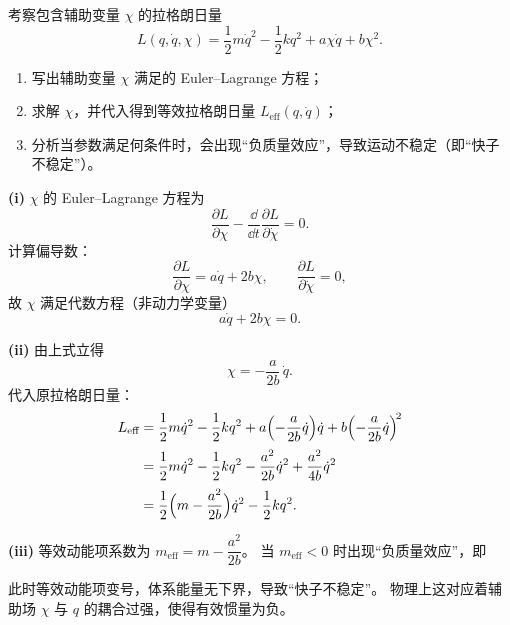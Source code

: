 \begin{question}[含辅助变量的拉格朗日量]
考察包含辅助变量 $\chi$ 的拉格朗日量
\[
L(q,\dot q,\chi)=\frac12 m\dot q^{2}-\frac12 k q^{2}+a\chi\dot q+b\chi^{2}.
\]

\begin{enumerate}[label=(\roman*)]
  \item 写出辅助变量 $\chi$ 满足的 Euler--Lagrange 方程；
  \item 求解 $\chi$，并代入得到等效拉格朗日量 $L_{\text{eff}}(q,\dot q)$；
  \item 分析当参数满足何条件时，会出现``负质量效应''，导致运动不稳定（即``快子不稳定''）。
\end{enumerate}

\begin{solution}

\textbf{(i)} $\chi$ 的 Euler--Lagrange 方程为
\[
\frac{\partial L}{\partial\chi}-\frac{\dd}{\dd t}\frac{\partial L}{\partial\dot\chi}=0.
\]
计算偏导数：
\[
\frac{\partial L}{\partial\chi}=a\dot q+2b\chi,\qquad
\frac{\partial L}{\partial\dot\chi}=0,
\]
故 $\chi$ 满足代数方程（非动力学变量）
\[
a\dot q+2b\chi=0.
\]

\textbf{(ii)} 由上式立得
\[
\chi=-\frac{a}{2b}\,\dot q.
\]
代入原拉格朗日量：
\begin{align*}
L_{\text{eff}}
&=\frac12 m\dot q^{2}-\frac12 k q^{2}
+a\Bigl(-\frac{a}{2b}\dot q\Bigr)\dot q
+b\Bigl(-\frac{a}{2b}\dot q\Bigr)^{\!2} \\[2pt]
&=\frac12 m\dot q^{2}-\frac12 k q^{2}
-\frac{a^{2}}{2b}\dot q^{2}+\frac{a^{2}}{4b}\dot q^{2} \\[2pt]
&=\frac12\Bigl(m-\frac{a^{2}}{2b}\Bigr)\dot q^{2}
-\frac12 k q^{2}.
\end{align*}

\textbf{(iii)} 等效动能项系数为 $m_{\text{eff}}=m-\dfrac{a^{2}}{2b}$。
当 $m_{\text{eff}}<0$ 时出现``负质量效应''，即


此时等效动能项变号，体系能量无下界，导致``快子不稳定''。
物理上这对应着辅助场 $\chi$ 与 $q$ 的耦合过强，使得有效惯量为负。
\end{solution}
\end{question}


